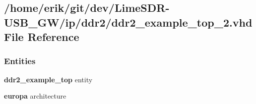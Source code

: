 \subsection{/home/erik/git/dev/\+Lime\+S\+D\+R-\/\+U\+S\+B\+\_\+\+G\+W/ip/ddr2/ddr2\+\_\+example\+\_\+top\+\_\+2.vhd File Reference}
\label{ddr2__example__top__2_8vhd}
\subsubsection*{Entities}
\begin{DoxyCompactItemize}
\item 
{\bf ddr2\+\_\+example\+\_\+top} entity
\item 
{\bf europa} architecture
\end{DoxyCompactItemize}
